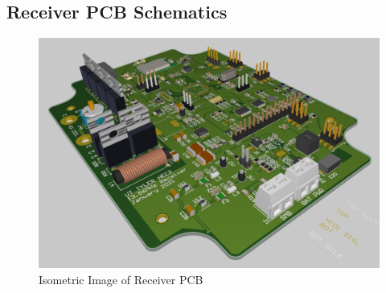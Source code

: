 \documentclass[12pt]{article}
\renewcommand{\thesection}{\Roman{section}}
\renewcommand{\thesubsection}{\thesection.\Alph{subsection}}
\begin{document}
\renewcommand{\thesubsection}{\thesection.\arabic{subsection}}




\pagebreak

\begin{appendices}
\section{Receiver PCB Schematics}
\hfill
\begin{figure}[h!]
\centering
\includegraphics[angle=270, width=0.85\linewidth]{recv_pcb_img}
\caption{Isometric Image of Receiver PCB}
\end{figure}
\hfill
\pagebreak

\pagebreak

\pagebreak

\pagebreak


\end{appendices}
\end{document}
